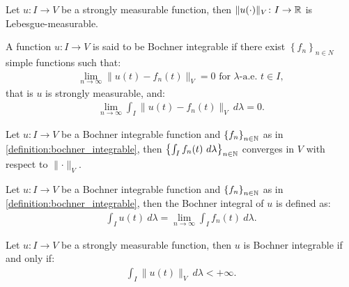 \begin{lemma}
    Let $u\colon I \rightarrow V$ be a strongly measurable function, then $\lVert u(\cdot) \rVert_V \colon I \rightarrow \mathbb{R}$ is Lebesgue-measurable.
\end{lemma}

\begin{definition} \label{definition:bochner_integrable}
    A function $u\colon I \rightarrow V$ is said to be Bochner integrable if there exist $\left\{ f_n \right\}_{n \in N}$ simple functions such that:
    \begin{gather}
        \lim_{n \rightarrow \infty} \lVert u(t) - f_n(t) \rVert_V = 0 \text{ for } \lambda \text{-a.e. } t \in I,
    \end{gather}
    that is  $u$ is strongly measurable, and:
    \begin{gather}
        \lim_{n \rightarrow \infty} \int_I \lVert u(t) - f_n(t) \rVert_V ~ d \lambda = 0.
    \end{gather}
\end{definition}

\begin{lemma}
    Let $u\colon I \rightarrow V$ be a Bochner integrable function and $\left\{ f_n \right\}_{n \in \mathbb{N}}$ as in \ref{definition:bochner_integrable}, then $\left\{ \int_I f_n(t) ~ d \lambda \right\}_{n \in \mathbb{N}}$ converges in $V$ with respect to $\lVert \cdot \rVert_V$.
\end{lemma}

\begin{definition}
    Let $u\colon I \rightarrow V$ be a Bochner integrable function and $\left\{ f_n \right\}_{n \in \mathbb{N}}$ as in \ref{definition:bochner_integrable}, then the Bochner integral of $u$ is defined as:
    \begin{gather}
        \int_I u(t) ~ d \lambda = \lim_{n \rightarrow \infty} \int_I f_n(t) ~ d \lambda.
    \end{gather}
\end{definition}

\begin{theorem}[Bochner]
    Let $u\colon I \rightarrow V$ be a strongly measurable function, then $u$ is Bochner integrable if and only if:
    \begin{gather}
        \int_I \lVert u(t) \rVert_V ~ d \lambda < + \infty.
    \end{gather}
\end{theorem}

\newpage
